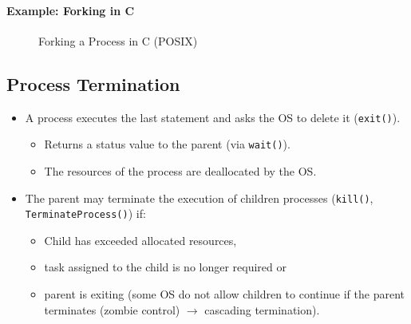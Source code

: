             \paragraph{Example: Forking in C}
	            \begin{figure}[H]
	            	\centering
	            	
	            	\caption{Forking a Process in C (POSIX)}
	            \end{figure}

        \subsection{Process Termination}
            \begin{itemize}
            	\item A process executes the last statement and asks the OS to delete it (\texttt{exit()}).
                	\begin{itemize}
                		\item Returns a status value to the parent (via \texttt{wait()}).
                		\item The resources of the process are deallocated by the OS.
                	\end{itemize}
            	\item The parent may terminate the execution of children processes (\texttt{kill()}, \texttt{TerminateProcess()}) if:
                	\begin{itemize}
                		\item Child has exceeded allocated resources,
                		\item task assigned to the child is no longer required or
                		\item parent is exiting (some OS do not allow children to continue if the parent terminates (zombie control) \(\rightarrow\) cascading termination).
                	\end{itemize}
            \end{itemize}

